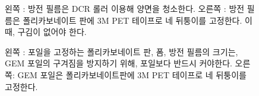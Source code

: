 \begin{figure}[htb]
  \centering
  \caption[방전 필름의 처리]{왼쪽 : 방전 필름은 DCR 롤러 이용해 양면을 청소한다. 오른쪽 : 방전 필름은 폴리카보네이트 판에 3M PET 테이프로 네 뒤퉁이를 고정한다. 이 때, 구김이 없어야 한다.}
  \label{fig:anti_static}
\end{figure}
\begin{figure}[htb]
  \centering
  \caption[GEM 포일의 고정]{왼쪽 : 포일을 고정하는 폴리카보네이트 판, 폼, 방전 필름의 크기는, GEM 포일의 구겨짐을 방지하기 위해, 포일보다 반드시 커야한다. 오른쪽: GEM 포일은 폴리카보네이트판에 3M PET 테이프로 네 뒤퉁이를 고정한다.}
  \label{fig:fixing_foil}
\end{figure}

